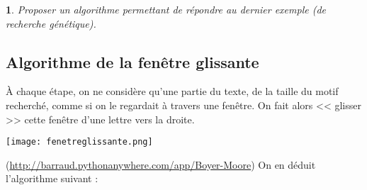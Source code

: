 \documentclass[a4paper,10pt]{report}  %
\theoremstyle{exo}
\newtheorem{exo}{}
\begin{document}
\begin{exo}Proposer un algorithme permettant de répondre au dernier exemple (de recherche génétique).
\end{exo}

\subsection{Algorithme de la fenêtre glissante}



À chaque étape, on ne considère qu'une partie du texte, de la taille du motif recherché, comme si on le regardait à travers une fenêtre. On fait alors << glisser >> cette fenêtre d'une lettre vers la droite.

\noindent\texttt{[image: fenetreglissante.png]}

(\href{http://barraud.pythonanywhere.com/app/Boyer-Moore}{http://barraud.pythonanywhere.com/app/Boyer-Moore}) On en déduit l'algorithme suivant :
%
%

\begin{algorithm}[H]
\end{algorithm}
\end{document}
